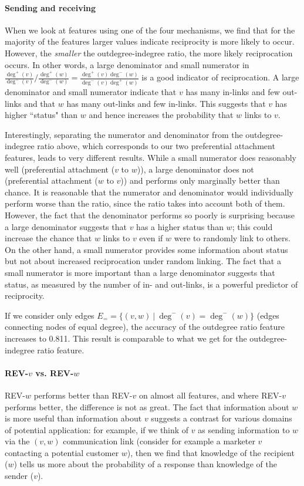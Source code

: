 \documentclass[conference]{IEEEtran}
\begin{document}
\paragraph{Sending and receiving}
When we look at features using one of the four mechanisms, we find that for the majority of the features larger values indicate reciprocity is more likely to occur.  However, the \emph{smaller} the outdegree-indegree ratio, the more likely reciprocation occurs. 
In other words, a large denominator and small numerator in $\frac{\deg^+(v)}{\deg^-(v)} / \frac{\deg^+(w)}{\deg^-(w)} = \frac{\deg^+(v)\deg^-(w)}{\deg^-(v)\deg^+(w)}$ is a good indicator of reciprocation. A large denominator and small numerator indicate that $v$ has many in-links and few out-links and that $w$ has many out-links and few in-links. This suggests that $v$ has higher ``status" than $w$ and hence increases the probability that $w$ links to $v$.

Interestingly, separating the numerator and denominator from the
outdegree-indegree ratio above, which corresponds to our two
preferential attachment features, leads to very different
results.  While a small numerator does reasonably well (preferential
attachment ($v$ to $w$)), a large denominator does not (preferential
attachment ($w$ to $v$)) and performs only marginally better than
chance. It is reasonable that the numerator and denominator would 
individually perform worse than the ratio, since the ratio takes into
account both of them. However, the fact that the denominator performs
so poorly is surprising because a large denominator suggests
that $v$ has a higher status than $w$; this could increase the
chance that $w$ links to $v$ even if $w$ were to randomly link to
others. On the other hand, a small numerator provides some information
about status but not about increased reciprocation under 
random linking. The fact that a small numerator is more important than
a large denominator suggests that status, as measured by the number of in-
and out-links, is a powerful predictor of reciprocity.

If we consider only edges $E_= = \{(v,w)~|~\deg^-(v) = \deg^-(w)\}$ (edges connecting nodes of equal degree), 
the accuracy of the outdegree ratio feature increases to 0.811. 
This result is comparable to what we get for the outdegree-indegree ratio feature.
\paragraph{REV-$v$ vs. REV-$w$}
REV-$w$ performs better than REV-$v$ on almost all features, and where REV-$v$ performs better, 
the difference is not as great.
The fact that information about $w$ is more useful than information
about $v$ suggests a contrast for various domains of
potential application: for example, if we think of $v$ as sending 
information to $w$ via the $(v,w)$ communication link (consider for example
a marketer $v$ contacting a potential customer $w$), then we find
that knowledge of the recipient ($w$) tells us more about the 
probability of a response than knowledge of the sender ($v$).
\end{document}
